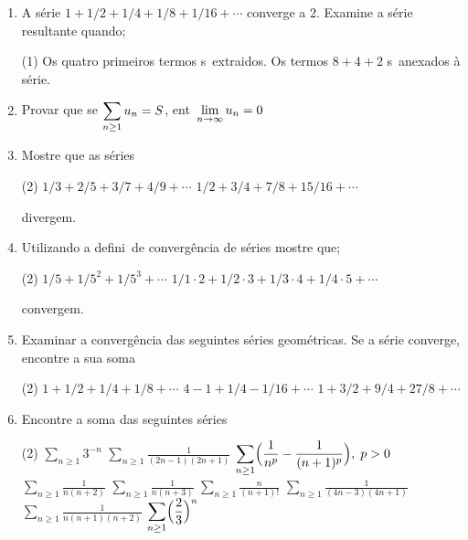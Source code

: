 \begin{enumerate}[label=\rm{(\arabic*)}]
\item A s\'erie $1+1/2+1/4+1/8+1/16+\cdots$ converge a $2$. Examine a s\'erie resultante quando;
\begin{tasks}[label=(\alph*),item-indent=6em,label-width=4ex,ref=(\alph*)](1)
\task Os quatro primeiros termos s\ao\ extraidos.
\task Os termos $8+4+2$ s\ao\ anexados \`a s\'erie.
\end{tasks}
\item Provar que se $\displaystyle{\sum_{n\geq1}u_n=S}$, ent\ao\ $\displaystyle{\lim_{n\to\infty}u_n=0}$
\item Mostre que as s\'eries
\begin{tasks}[label=(\alph*),item-indent=6em,label-width=4ex,ref=(\alph*)](2)
\task \(1/3+2/5+3/7+4/9+\cdots\)
\task \(1/2+3/4+7/8+15/16+\cdots\)
\end{tasks}
divergem.
\item Utilizando a defini\cao\ de converg\^encia de s\'eries mostre que;
\begin{tasks}[label=(\alph*),item-indent=6em,label-width=4ex,ref=(\alph*)](2)
\task \(1/5+1/5^2+1/5^3+\cdots\)
\task \(1/1\cdot2+1/2\cdot3+1/3\cdot4+1/4\cdot5+\cdots\)
\end{tasks}
convergem.
\item Examinar a converg\^encia das seguintes s\'eries geom\'etricas. Se a s\'erie converge,
encontre a sua soma
\begin{tasks}[label=(\alph*),item-indent=6em,label-width=4ex,ref=(\alph*)](2)
\task \(1+1/2+1/4+1/8+\cdots \)
\task \(4-1+1/4-1/16+\cdots\)
\task \(1+3/2+9/4+27/8+\cdots \)
\end{tasks}
\item Encontre a soma das seguintes s\'eries
\begin{tasks}[label=(\alph*),item-indent=6em,label-width=4ex,ref=(\alph*)](2)
\task \(\displaystyle{\sum_{n\geq1}3^{-n}}\)
\task \(\displaystyle{\sum_{n\geq1}\frac{1}{(2n-1)(2n+1)}}\)
\task \(\displaystyle{\sum_{n\geq1}\Bigl(\frac{1}{n^p}-\frac{1}{(n+1)^p}\Bigr)}, \; p>0\)
\task \(\displaystyle{\sum_{n\geq1}\frac{1}{n(n+2)}}\)
\task \(\displaystyle{\sum_{n\geq1}\frac{1}{n(n+3)}}\)
\task \(\displaystyle{\sum_{n\geq1}\frac{n}{(n+1)!}}\)
\task \(\displaystyle{\sum_{n\geq1}\frac{1}{(4n-3)(4n+1)}}\)
\task \(\displaystyle{\sum_{n\geq1}\frac{1}{n(n+1)(n+2)}}\)
\task \(\displaystyle{\sum_{n\geq1} \Bigl(\frac{2}{3}\Bigr)^n}\)
\end{tasks}


\end{enumerate}
